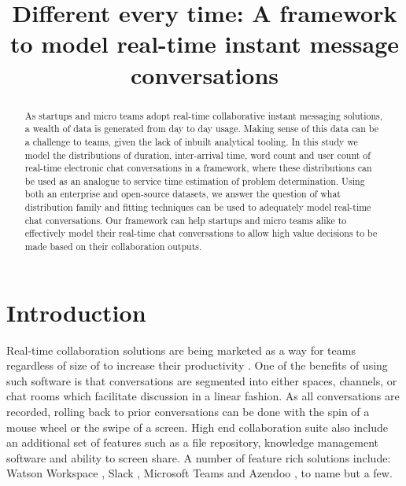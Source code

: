 \documentclass[conference]{IEEEtran}
\begin{document}
\title{Different every time: A framework to model real-time instant message conversations}
\date{}%

\author{
\and
{}
}\maketitle

\begin{abstract}
As startups and micro teams adopt real-time collaborative instant messaging solutions, a wealth of data is generated from day to day usage. Making sense of this data can be a challenge to teams, given the lack of inbuilt analytical tooling. In this study we model the distributions of duration, inter-arrival time, word count and user count of real-time electronic chat conversations in a framework, where these distributions can be used as an analogue to service time estimation of problem determination. Using both an enterprise and open-source datasets, we answer the question of what distribution family and fitting techniques can be used to adequately model real-time chat conversations. Our framework can help startups and micro teams alike to effectively model their real-time chat conversations to allow high value decisions to be made based on their collaboration outputs.
\end{abstract}

\section{Introduction}

Real-time collaboration solutions are being marketed as a way for teams regardless of size of to increase their productivity \cite{SmartCollab} \cite{eightbiz} \cite{slackSME}. One of the benefits of using such software is that conversations are segmented into either spaces, channels, or chat rooms which facilitate discussion in a linear fashion. As all conversations are recorded, rolling back to prior conversations can be done with the spin of a mouse wheel or the swipe of a screen. High end collaboration suite also include an additional set of features such as a file repository, knowledge management software and ability to screen share.  A number of feature rich solutions include: Watson Workspace \cite{WatWork}, Slack \cite{Slack}, Microsoft Teams \cite{MSTeams} and Azendoo \cite{Azendo}, to name but a few.  
\end{document}
